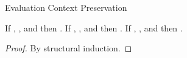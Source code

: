 \begin{lemma}{Evaluation Context Preservation}

\label{lemeva}

If \judeh{}{\first{\varexph}}{\first{\vartyh}}, \judeh{}{\second{\varexph}}{\first{\vartyh}}, and \judeh{}{\redconh{\first{\varexph}}}{\second{\vartyh}} then \judeh{}{\redconh{\second{\varexph}}}{\second{\vartyh}}.
If \judem{}{\first{\varexpm}}{\first{\vartym}}, \judem{}{\second{\varexpm}}{\first{\vartym}}, and \judem{}{\redconm{\first{\varexpm}}}{\second{\vartym}} then \judem{}{\redconm{\second{\varexpm}}}{\second{\vartym}}.
If \judes{}{\first{\varexps}}{\tytst}, \judes{}{\second{\varexps}}{\tytst}, and \judes{}{\redcons{\first{\varexps}}}{\tytst} then \judes{}{\redcons{\second{\varexps}}}{\tytst}.

\begin{proof}

By structural induction.

\end{proof}

\end{lemma}
